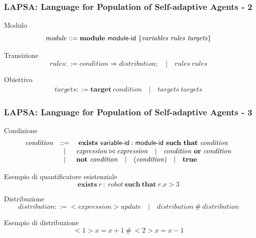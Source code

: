 \documentclass[10pt]{beamer}
\begin{document}
	\begin{frame}
		\frametitle{LAPSA: Language for Population of Self-adaptive Agents - 2}
		\begin{block}{Modulo}
			$$ \mathit{module} ::= \mathbf{module} \ \sf{module}\textrm{-}\sf{id} \ \{ \mathit{variables} \ \mathit{rules} \ \mathit{targets} \} $$
		\end{block}
		\begin{block}{Transizione}
		$$
		\mathit{rules} ::= \mathit{condition} \Rightarrow \mathit{distribution}; \quad|\quad \mathit{rules} \ \mathit{rules}
		$$
		\end{block}
		\begin{block}{Obiettivo}
		$$
		\begin{array}{rcl}
			\mathit{targets} ::= \mathbf{target} \ \mathit{condition} \quad|\quad \mathit{targets} \ \mathit{targets}
		\end{array}
		$$
		\end{block}
	\end{frame}
	\begin{frame}
		\frametitle{LAPSA: Language for Population of Self-adaptive Agents - 3}
		\begin{block}{Condizione}
		$$
		\begin{array}{rcl}
	\mathit{condition} &::=& \ \mathbf{exists} \ \sf{variable}\textrm{-}\sf{id}:\sf{module}\textrm{-}\sf{id} \ \mathbf{such}\ \mathbf{that} \ \mathit{condition} \\
	&|& \mathit{expression} \bowtie \mathit{expression} \quad|\quad \mathit{condition} \ \mathbf{or} \ \mathit{condition} \\
	&|& \mathbf{not} \ \mathit{condition} \quad|\quad (\mathit{condition}) \quad|\quad \mathbf{true} \\
		\end{array}
		$$
		\end{block}
		\begin{exampleblock}{Esempio di quantificatore esistenziale}
			$$ \mathbf{exists}\ r\ :\ robot\ \mathbf{such}\ \mathbf{that}\ r.x > 3 $$
		\end{exampleblock}
		\begin{block}{Distribuzione}
		$$		
		\mathit{distribution} ::= <\mathit{expression}> \mathit{update} \quad|\quad \mathit{distribution} \ \# \ \mathit{distribution}
		$$
		\end{block}
		\begin{exampleblock}{Esempio di distribuzione}
			$$ <1> x=x+1 \ \# \ <2> x=x-1 $$
		\end{exampleblock}
	\end{frame}
\end{document}
